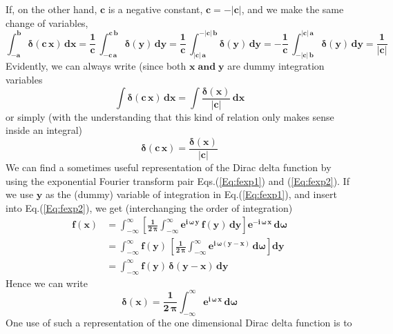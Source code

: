 \documentclass[12pt]{article}
\begin{document}
\noindent If, on the other hand, $\mathbf{c}$ is a negative constant, 
  $\mathbf{c = -\vert c \vert}$, and we make the same change of variables,
\begin{equation}
\mathbf{\int_{-a}^{b} \boldsymbol{\delta}(c\,x) \,dx = 
   \frac{1}{c} \,  \int_{-c\,a}^{c\,b} \boldsymbol{\delta}(y) \,dy = 
   \frac{1}{c} \,  \int_{\vert c \vert \,a}^{-\vert c \vert \,b} \boldsymbol{\delta}(y) \,dy = 
    - \frac{1}{c} \,  \int_{-\vert c \vert \,b}^{\vert c \vert \,a} \boldsymbol{\delta}(y) \,dy = 
      \frac{1}{\vert c \vert}	}
\end{equation}
Evidently, we can always write (since both $\mathbf{x \; \text{and} \; y}$ are dummy integration
  variables
\begin{equation}
\mathbf{\int  \boldsymbol{\delta}(c\,x) \,dx = \int \frac{\boldsymbol{\delta}(x)}{ \vert c \vert}\,dx}
\end{equation}
or simply (with the understanding that this kind of relation only makes sense inside an
  integral)
\begin{equation}  \label{Eq:delta1}
\mathbf{ \boldsymbol{\delta}(c\,x) = \frac{\boldsymbol{\delta}(x)}{ \vert c \vert} }
\end{equation}
We can find a sometimes useful representation of the Dirac delta function by using the exponential
  Fourier transform pair Eqs.(\ref{Eq:fexp1}) and (\ref{Eq:fexp2}).
If we use $\mathbf{y}$ as the (dummy) variable of integration in Eq.(\ref{Eq:fexp1}), and
  insert into Eq.(\ref{Eq:fexp2}), we get (interchanging the order of integration)
\begin{align*}
\mathbf{f(x)} &= \mathbf{\int_{-\infty}^{\infty} \left[\frac{1}{2\,\boldsymbol{\pi}} 
                  \int_{-\infty}^{\infty} e^{i\,\boldsymbol{\omega}\,y}\,f(y)\,dy \right]
				  e^{-i\,\boldsymbol{\omega}\,x}\,d\boldsymbol{\omega} } \\
		&= 	\mathbf{\int_{-\infty}^{\infty} f(y)\, \left[ \frac{1}{2\,\boldsymbol{\pi}}
		      \int_{-\infty}^{\infty} e^{i\,\boldsymbol{\omega} (y-x)}\,d\boldsymbol{\omega} \right] dy} \\
		&= 	\mathbf{ \int_{-\infty}^{\infty} f(y)\, \boldsymbol{\delta}(y-x)\,dy }
\end{align*}
Hence we can write
\begin{equation}  \label{Eq:delta2}
\mathbf{ \boldsymbol{\delta}(x) = \frac{1}{2\,\boldsymbol{\pi}}	\int_{-\infty}^{\infty} 
               e^{i\,\boldsymbol{\omega}\,x}\,	d\boldsymbol{\omega} }
\end{equation}
One use of such a representation of the one dimensional Dirac delta function is to
\end{document}
